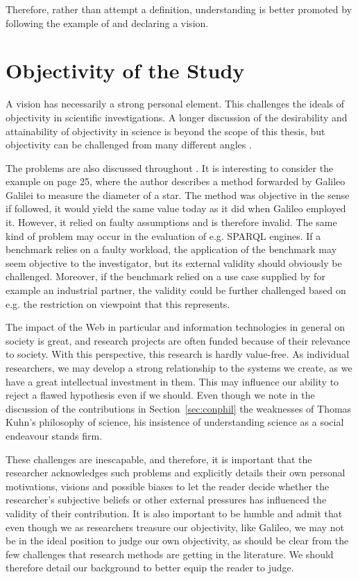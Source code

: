 Therefore, rather than attempt a definition, understanding is better
promoted by following the example of \cite{berners2001semantic} and
declaring a vision.


\section{Objectivity of the Study}\label{sec:objectivity}

A vision has necessarily a strong personal element. This challenges
the ideals of objectivity in scientific investigations. A longer
discussion of the desirability and attainability of objectivity in
science is beyond the scope of this thesis, but objectivity can be
challenged from many different angles
\cite{sep-scientific-objectivity}.

The problems are also discussed throughout
\cite{chalmers1999whatis}. It is interesting to consider the example
on page 25, where the author describes a method forwarded by Galileo
Galilei to measure the diameter of a star. The method was objective in
the sense if followed, it would yield the same value today as it did
when Galileo employed it. However, it relied on faulty assumptions and
is therefore invalid. The same kind of problem may occur in the
evaluation of e.g. SPARQL engines. If a benchmark relies on a faulty
workload, the application of the benchmark may seem objective to the
investigator, but its external validity should obviously be
challenged. Moreover, if the benchmark relied on a use case supplied
by for example an industrial partner, the validity could be further
challenged based on e.g. the restriction on viewpoint that this
represents. 

The impact of the Web in particular and information technologies in
general on society is great, and research projects are often funded
because of their relevance to society. With this perspective, this
research is hardly value-free. As individual researchers, we may
develop a strong relationship to the systems we create, as we have a
great intellectual investment in them. This may influence our ability
to reject a flawed hypothesis even if we should. Even though we note
in the discussion of the contributions in Section~\ref{sec:conphil}
the weaknesses of Thomas Kuhn's philosophy of science, his insistence
of understanding science as a social endeavour stands firm.

These challenges are inescapable, and therefore, it is important that
the researcher acknowledges such problems and explicitly details their
own personal motivations, visions and possible biases to let the
reader decide whether the researcher's subjective beliefs or other
external pressures has influenced the validity of their
contribution. It is also important to be humble and admit that even
though we as researchers treasure our objectivity, like Galileo, we
may not be in the ideal position to judge our own objectivity, as
should be clear from the few challenges that research methods are
getting in the literature. We should therefore detail our background
to better equip the reader to judge.

